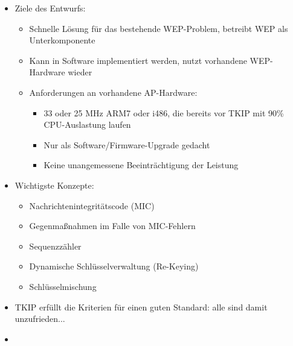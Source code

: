 \documentclass[a4paper]{article}
\begin{document}
\begin{multicols}{3}
    \begin{itemize}
        \item
              Ziele des Entwurfs:

              \begin{itemize}
                  \item
                        Schnelle Lösung für das bestehende WEP-Problem, betreibt WEP als
                        Unterkomponente
                  \item
                        Kann in Software implementiert werden, nutzt vorhandene WEP-Hardware
                        wieder
                  \item
                        Anforderungen an vorhandene AP-Hardware:

                        \begin{itemize}
                            \item
                                  33 oder 25 MHz ARM7 oder i486, die bereits vor TKIP mit 90\%
                                  CPU-Auslastung laufen
                            \item
                                  Nur als Software/Firmware-Upgrade gedacht
                            \item
                                  Keine unangemessene Beeinträchtigung der Leistung
                        \end{itemize}
              \end{itemize}
        \item
              Wichtigste Konzepte:

              \begin{itemize}
                  \item
                        Nachrichtenintegritätscode (MIC)
                  \item
                        Gegenmaßnahmen im Falle von MIC-Fehlern
                  \item
                        Sequenzzähler
                  \item
                        Dynamische Schlüsselverwaltung (Re-Keying)
                  \item
                        Schlüsselmischung
              \end{itemize}
        \item
              TKIP erfüllt die Kriterien für einen guten Standard: alle sind damit
              unzufrieden...
        \item
    \end{itemize}


\end{multicols}
\end{document}
